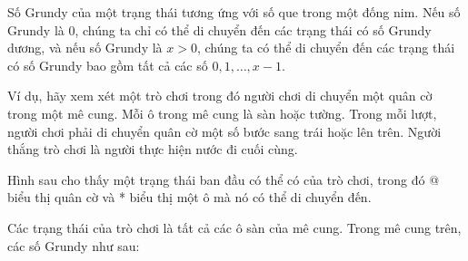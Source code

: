 Số Grundy của một trạng thái tương ứng với
số que trong một đống nim.
Nếu số Grundy là 0, chúng ta chỉ có thể di chuyển đến
các trạng thái có số Grundy dương,
và nếu số Grundy là $x>0$, chúng ta có thể di chuyển
đến các trạng thái có số Grundy bao gồm tất cả các số
$0,1,\ldots,x-1$.

Ví dụ, hãy xem xét một trò chơi trong đó
người chơi di chuyển một quân cờ trong một mê cung.
Mỗi ô trong mê cung là sàn hoặc tường.
Trong mỗi lượt, người chơi phải di chuyển
quân cờ một số
bước sang trái hoặc lên trên.
Người thắng trò chơi là người
thực hiện nước đi cuối cùng.

Hình sau cho thấy một trạng thái ban đầu có thể có
của trò chơi, trong đó @ biểu thị quân cờ và *
biểu thị một ô mà nó có thể di chuyển đến.

\begin{center}
\end{center}

Các trạng thái của trò chơi là tất cả các ô sàn
của mê cung.
Trong mê cung trên, các số Grundy
như sau:

